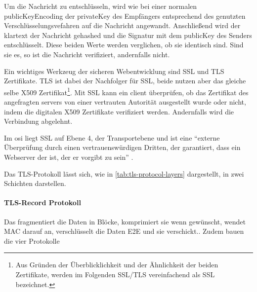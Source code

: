Um die Nachricht zu entschlüsseln, wird wie bei einer normalen \gls{publicKeyEncoding} der \gls{privateKey} des Empfängers entsprechend des genutzten Verschlüsselungsvefahren auf die Nachricht angewandt. Anschließend wird der \gls{klartext} der Nachricht gehashed und die Signatur mit dem \gls{publicKey} des Senders entschlüsselt. Diese beiden Werte werden verglichen, ob sie identisch sind. Sind sie es, so ist die Nachricht verifiziert, andernfalls nicht. \autocite[\pagef~297]{6391693}

Ein wichtiges Werkzeug der sicheren Webentwicklung sind \ac{SSL} und \ac{TLS} Zertifikate. \ac{TLS} ist dabei der Nachfolger für \ac{SSL}, beide nutzen aber das gleiche selbe \gls{X509} Zertifikat\footnote{Aus Gründen der Überblicklichkeit und der Ähnlichkeit der beiden Zertifikate, werden im Folgenden \ac{SSL}/\ac{TLS} vereinfachend als \ac{SSL} bezeichnet.}. Mit \ac{SSL} kann ein \gls{client} überprüfen, ob das Zertifikat des angefragten \glspl{server} von einer vertrauten Autorität ausgestellt wurde oder nicht, indem die digitalen \gls{X509} Zertifikate verifiziert werden. Andernfalls wird die Verbindung abgelehnt. \autocite[\pagef~1]{zhang_analysis_2014}
\par
Im \gls{osi} liegt \ac{SSL} auf Ebene 4, der Transportebene \autocite{HowTLSSS99:online} und ist eine \enquote{externe Überprüfung durch einen vertrauenswürdigen Dritten, der garantiert, dass ein Webserver der ist, der er vorgibt zu sein} \autocite[Grund Nr. 3]{CloudfareWarumHTTPS:online}.

Das \ac{TLS}-Protokoll lässt sich, wie in \autoref{tab:tls-protocol-layers} dargestellt, in zwei Schichten darstellen.

\begin{table}[htpb]
\caption{TLS-Protokoll Schichten}
\label{tab:tls-protocol-layers}
\end{table}

\paragraph[TLS-Record Protocol]{\ac{TLS}-Record Protokoll}\label{par:tls_record_protocol}
Das  fragmentiert die Daten in Blöcke, komprimiert sie wenn gewünscht, wendet \ac{MAC} darauf an, verschlüsselt die Daten \ac{E2E} und sie verschickt.\autocite[\vglf][]{Transpor18:online}. Zudem bauen die vier Protokolle 

